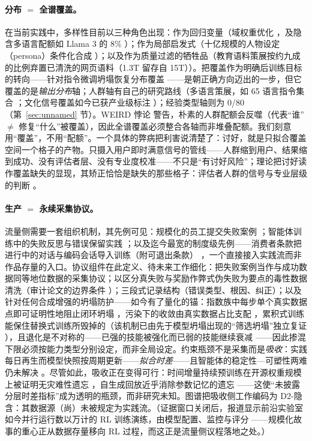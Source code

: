 \documentclass[10pt,fontset=fandol]{ctexart}
\begin{document}
\paragraph{分布 $=$ 全谱覆盖。}
在当前实践中，多样性目前以三种角色出现：作为回归变量（域权重优化 \cite{xie2023doremi, ye2024data}，及隐含多语言配额如 Llama 3 的 8\% \cite{grattafiori2024llama3}）；作为局部启发式（十亿规模的人物设定（persona）条件化合成 \cite{ge2024scaling}）；以及作为质量过滤的牺牲品（教育语料策展按约九成的比例弃置已清洗的网页语料（1.3T 留存自 15T）\cite{penedo2024fineweb}）。把覆盖作为明确后训练目标的转向——针对指令微调坍塌恢复分布覆盖 \cite{sorensen2025spectrum}——是朝正确方向迈出的一步，但它覆盖的是\emph{输出分布}轴；人群轴有自己的研究路线（多语言策展，如 65 语言指令集合 \cite{singh2024aya}；文化信号覆盖如今已获产业级标注 \cite{sahu2026culturefunnel}）；经验类型轴则为 0/80（第~\ref{sec:unnamed} 节）。WEIRD 悖论 \cite{zhou2025should} 警告，朴素的人群配额会反噬（代表“谁” $\neq$ 修复“什么”被覆盖），因此全谱覆盖必须整合各轴而非堆叠配额。我们刻意用“覆盖”，不用“配额”。一个具体的弊病把利害说清楚了：讨好，就是只拟合覆盖空间一个格子的产物。只摄入用户即时满意信号的管线——人群缩到用户、结果缩到成功、没有评估者层、没有专业度校准——不只是“有讨好风险”；理论把讨好读作覆盖缺失的显现，其矫正恰恰是缺失的那些格子：评估者人群的信号与专业层级的判断 \cite{yu2026methodology}。

\paragraph{生产 $=$ 永续采集协议。}
流量侧需要一套组织机制，其先例可见：规模化的员工提交失败案例 \cite{deepseek2026v41}；智能体训练中的失败反思与错误保留实践 \cite{xiaomi2026mimo, zai2026glm5}；以及迄今最宽的制度级先例——消费者条款把进行中的对话与编码会话导入训练（附可退出条款） \cite{anthropic2025consumerterms}，一个直接接入实践流而非作品存量的入口。协议组件在此定义、待未来工作细化：把失败案例当作与成功数据同等地位数据的采集协议；以区分真失败与奖励作弊式伪失败为要点的毒性数据清洗（审计论文的边界条件 \cite{yu2026failure}）；三段式记录结构（错误类型、根因、纠正）；以及针对任何合成增强的坍塌防护——如今有了量化的锚：指数族中每步单个真实数据点即可证明性地阻止闭环坍塌 \cite{jangjoo2026lost}，污染下的收敛由真实数据占比支配 \cite{wang2026guarantees}，累积式训练能保住替换式训练所毁掉的（该机制已由先于模型坍塌出现的“筛选坍塌”独立复证 \cite{zhang2026screening}），且退化是不对称的——已强的技能被强化而已弱的技能继续衰减 \cite{luo2026polarization}——因此掺混下限必须按能力类型分别设定，而非全局设定。约束瓶颈不是采集而是\emph{吸收}：实践每日再生而模型快照按周期更新——\emph{拟合时差}——且智能体的稳定性—可塑性两难仍未解决 \cite{wu2026agentdice}。尽管如此，吸收正在变得可行：时间增量持续预训练在开源权重规模上被证明无灾难性遗忘 \cite{oncel2026timeincremental}，自生成回放近乎消除参数记忆的遗忘 \cite{marek2026replay}——这使“未披露分层时差指标”成为透明的瓶颈，而非研究未知。图谱把吸收侧工作编码为 D2-隐含：其数据源（尚）未被规定为实践流。（证据窗口关闭后，报道显示前沿实验室如今并行运行数以万计的 RL 训练演练，由模型配置、监控与评分 \cite{nolan2026fortune}——规模化故事的重心正从数据存量移向 RL 过程，而这正是流量侧议程落地之处。）
\end{document}
